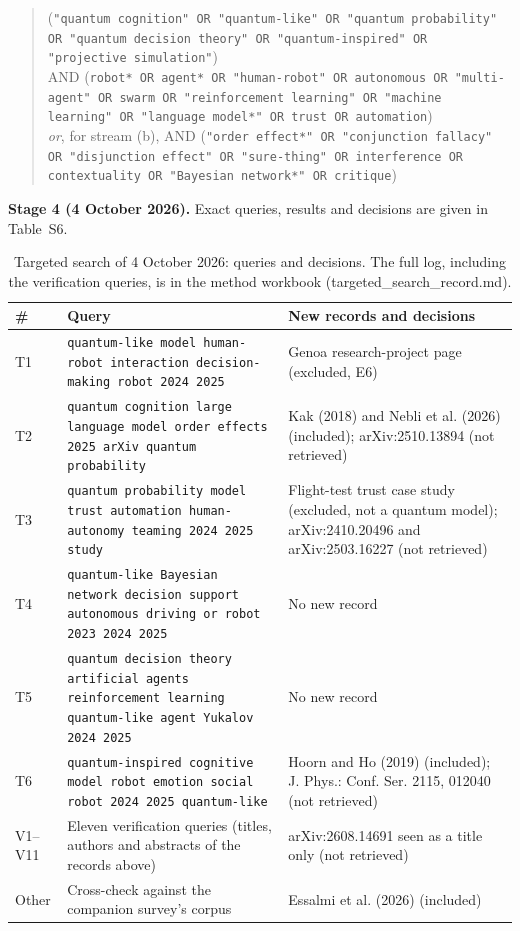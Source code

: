 \documentclass[10pt,a4paper]{article}
\begin{document}
\begin{quote}\small
(\texttt{"quantum cognition" OR "quantum-like" OR "quantum probability" OR "quantum decision theory" OR "quantum-inspired" OR "projective simulation"})\\
AND (\texttt{robot* OR agent* OR "human-robot" OR autonomous OR "multi-agent" OR swarm OR "reinforcement learning" OR "machine learning" OR "language model*" OR trust OR automation})\\
\emph{or}, for stream (b), AND (\texttt{"order effect*" OR "conjunction fallacy" OR "disjunction effect" OR "sure-thing" OR interference OR contextuality OR "Bayesian network*" OR critique})
\end{quote}

\noindent\textbf{Stage 4 (4 October 2026).} Exact queries, results and decisions are given in Table~S6.


\begin{longtable}{@{}P{1.3cm}P{7.6cm}P{7.4cm}@{}}
\caption{Targeted search of 4 October 2026: queries and decisions. The full log, including the verification queries, is in the method workbook (targeted\_search\_record.md).}\label{tab:S6}\\
\toprule \textbf{\#} & \textbf{Query} & \textbf{New records and decisions} \\ \midrule \endfirsthead
\bottomrule \endfoot

T1 & \texttt{quantum-like model human-robot interaction decision-making robot 2024 2025} & Genoa research-project page (excluded, E6) \\
T2 & \texttt{quantum cognition large language model order effects 2025 arXiv quantum probability} & Kak (2018) and Nebli et al. (2026) (included); arXiv:2510.13894 (not retrieved) \\
T3 & \texttt{quantum probability model trust automation human-autonomy teaming 2024 2025 study} & Flight-test trust case study (excluded, not a quantum model); arXiv:2410.20496 and arXiv:2503.16227 (not retrieved) \\
T4 & \texttt{quantum-like Bayesian network decision support autonomous driving or robot 2023 2024 2025} & No new record \\
T5 & \texttt{quantum decision theory artificial agents reinforcement learning quantum-like agent Yukalov 2024 2025} & No new record \\
T6 & \texttt{quantum-inspired cognitive model robot emotion social robot 2024 2025 quantum-like} & Hoorn and Ho (2019) (included); J. Phys.: Conf. Ser. 2115, 012040 (not retrieved) \\
V1--V11 & Eleven verification queries (titles, authors and abstracts of the records above) & arXiv:2608.14691 seen as a title only (not retrieved) \\
Other & Cross-check against the companion survey's corpus & Essalmi et al. (2026) (included) \\
\end{longtable}
\end{document}
